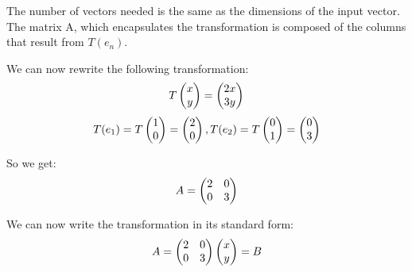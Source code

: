 \documentclass{article}
\begin{document}
	\par\noindent The number of vectors needed is the same as the dimensions of the input vector. The matrix A, which encapsulates the transformation is composed of the columns that result from \(T(e_n)\).
	\newpage
	\par\noindent We can now rewrite the following transformation:
	\[
	T
	\left(\begin{array}{@{}c@{}}
		x \\
		y \\
	\end{array}\right) = 
	\left(\begin{array}{@{}c@{}}
		2x \\
		3y \\
	\end{array}\right) 
	\]
			 \[
	T(e_1) = T
	\left(\begin{array}{@{}c@{}}
		1 \\
		0 \\
	\end{array}\right) = 
	\left(\begin{array}{@{}c@{}}
		2 \\
		0 \\
	\end{array}\right) , 
	T(e_2)=T
	\left(\begin{array}{@{}c@{}}
		0 \\
		1 \\
	\end{array}\right) = 
	\left(\begin{array}{@{}c@{}}
		0 \\
		3 \\
	\end{array}\right) 
	\]
	\newline
	\par\noindent So we get:
	\[A=
		\left(\begin{array}{@{}cc@{}}
		2 & 0 \\
		0 & 3 \\
	\end{array}\right)
	\]
	\par\noindent We can now write the transformation in its standard form:
		\[A=
	\left(\begin{array}{@{}cc@{}}
		2 & 0 \\
		0 & 3 \\
	\end{array}\right)
	\left(\begin{array}{@{}c@{}}
	x \\
	y \\
\end{array}\right) = B
	\]
		
\end{document}
